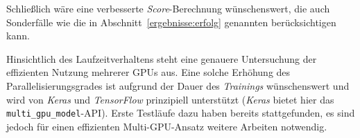Schließlich wäre eine verbesserte \textit{Score}-Berechnung wünschenswert, die auch Sonderfälle wie die in
Abschnitt~\ref{ergebnisse:erfolg} genannten berücksichtigen kann.

Hinsichtlich des Laufzeitverhaltens steht eine genauere Untersuchung der effizienten Nutzung mehrerer GPUs aus. Eine
solche Erhöhung des Parallelisierungsgrades ist aufgrund der Dauer des \textit{Trainings} wünschenswert und wird von
\textit{Keras} und \textit{TensorFlow} prinzipiell unterstützt (\textit{Keras} bietet hier das
\texttt{multi\_gpu\_model}-API). Erste Testläufe dazu haben bereits stattgefunden, es sind jedoch für einen effizienten
Multi-GPU-Ansatz weitere Arbeiten notwendig.
